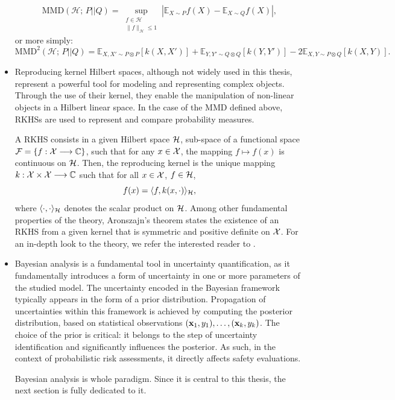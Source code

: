 \begin{itemize}
        \begin{equation}
            \text{MMD}(\mathcal{H};\, P||Q) = \sup_{\substack{f \in \mathcal{H}\\ \|f\|_{\mathcal{H}} \leq 1}} |\mathbb{E}_{X \sim P}f(X) - \mathbb{E}_{X \sim Q}f(X)|,
        \end{equation}
      or more simply:
      \begin{equation}
        \text{MMD}^2(\mathcal{H};\, P||Q) = \mathbb{E}_{X, X' \sim P \otimes P}[k(X, X')] + \mathbb{E}_{Y, Y' \sim Q \otimes Q}[k(Y, Y')] - 2 \mathbb{E}_{X,Y \sim P\otimes Q}[k(X, Y)].
      \end{equation}

    \item Reproducing kernel Hilbert spaces, although not widely used in this thesis, represent a powerful tool for modeling and representing complex objects. Through the use of their 
    kernel, they enable the manipulation of non-linear objects in a Hilbert linear space. In the case of the
    MMD defined above, RKHSs are used to represent and compare probability measures.

    A RKHS consists in a given Hilbert space $\mathcal{H}$, sub-space of a functional space $\mathcal{F}=\{f:\mathcal{X}\longrightarrow\mathbb{C}\}$, such that for any $x\in\mathcal{X}$, the mapping $f\mapsto f(x)$ is continuous on $\mathcal{H}$. Then, the reproducing kernel is the unique mapping $k:\mathcal{X}\times\mathcal{X}\longrightarrow\mathbb{C}$ such that for all $x\in\mathcal{X}$, $f\in\mathcal{H}$,
      \begin{equation}
        f(x) = \langle f,k(x,\cdot) \rangle_{\mathcal{H}},
      \end{equation}
    where $\langle\cdot,\cdot\rangle_{\mathcal{H}}$ denotes the scalar product on $\mathcal{H}$. Among other fundamental properties of the theory, Aronszajn's theorem \citep{aronszajn_theory_1950} states the existence of an RKHS from a given kernel that is symmetric and positive definite on $\mathcal{X}$. For an in-depth look to the theory, we refer the interested reader to  \cite{scholkopf_learning_2001}.

    \item  Bayesian analysis is a fundamental tool in uncertainty quantification, 
    as it fundamentally introduces a form of uncertainty
    in one or more parameters of the studied model. The uncertainty encoded in the Bayesian framework typically appears in the form of a prior distribution. Propagation of uncertainties within this framework is achieved by computing the posterior distribution, based on statistical observations $(\mathbf{x}_1, y_1), \ldots, (\mathbf{x}_k, y_k)$.
      The choice of the prior is critical: it belongs to the step of uncertainty identification and significantly influences the posterior. As such, in the context of probabilistic risk assessments, it directly affects safety evaluations.

      Bayesian analysis is whole paradigm. Since it is central to this thesis, the next section is fully dedicated to it.
\end{itemize}









